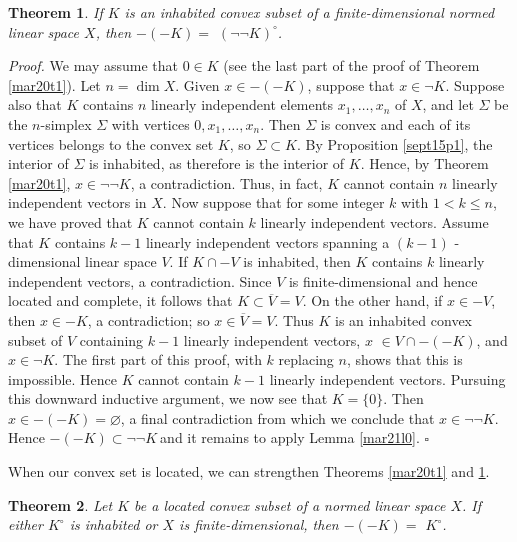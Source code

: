 \documentclass[11pt]{article}%
\newtheorem{theorem}{Theorem}
\newenvironment{proof}[1][Proof]{\noindent\textit{#1.} }{}
\begin{document}
\begin{theorem}
\label{mar20t2}If $K$ is an inhabited convex subset of a finite-dimensional
normed linear space $X$, then $-(-K)=$ $(\lnot\lnot K)^{\circ}$.
\end{theorem}

\begin{proof}
We may assume that $0\in K$ (see the last part of the proof of Theorem
\ref{mar20t1}). Let $n=\dim X$. Given $x\in-(-K)$, suppose that $x\in\lnot K$.
Suppose also that $K$ contains $n$ linearly independent elements $x_{1}%
,\ldots,x_{n}$ of $X$, and let $\Sigma$ be the $n$-simplex $\Sigma$ with
vertices $0,x_{1},\ldots,x_{n}$. Then $\Sigma$ is convex and each of its
vertices belongs to the convex set $K$, so $\Sigma\subset K$. By Proposition
\ref{sept15p1}, the interior of $\Sigma$ is inhabited, as therefore is the
interior of $K$. Hence, by Theorem \ref{mar20t1}, $x\in\lnot\lnot K$, a
contradiction. Thus, in fact, $K$ cannot contain $n$ linearly independent
vectors in $X$. Now suppose that for some integer $k$ with $1<k\leq n$, we
have proved that $K$ cannot contain $k$ linearly independent vectors. Assume
that $K$ contains $k-1$ linearly independent vectors spanning a $(k-1)$%
-dimensional linear space $V$. If $K\cap-V$ is inhabited, then $K$ contains
$k$ linearly independent vectors, a contradiction. Since $V$ is
finite-dimensional and hence located and complete, it follows that
$K\subset\overline{V}=V$. On the other hand, if $x\in-V$, then $x\in-K$, a
contradiction; so $x\in\overline{V}=V$. Thus $K$ is an inhabited convex subset
of $V$ containing $k-1$ linearly independent vectors, $x$ $\in V\cap-(-K)$,
and $x\in\lnot K$. The first part of this proof, with $k$ replacing $n$, shows
that this is impossible. Hence $K$ cannot contain $k-1$ linearly independent
vectors. Pursuing this downward inductive argument, we now see that $K=\{0\}$.
Then $x\in-(-K)=\varnothing$, a final contradiction from which we conclude
that $x\in\lnot\lnot K$. Hence $-(-K)\subset\lnot\lnot K\ $and it remains to
apply Lemma \ref{mar21l0}.%
\hfill
$\square$
\end{proof}

%

\medskip
When our convex set is located, we can strengthen Theorems \ref{mar20t1} and
\ref{mar20t2}.

\begin{theorem}
\label{mar24t1}Let $K$ be a located convex subset of a normed linear space $X
$. If either $K^{\circ}$ is inhabited or $X$ is finite-dimensional, then
$-(-K)=$ $K^{\circ}$.
\end{theorem}
\end{document}
